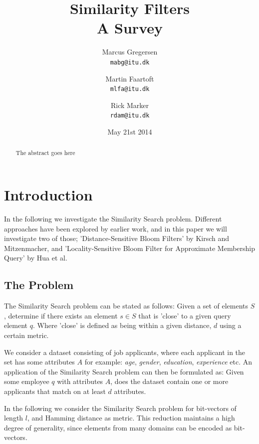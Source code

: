 \documentclass[a4paper,11pt]{article}
\begin{document}
\graphicspath{ {./images/} }
\date{May 21st 2014}
\title{Similarity Filters\\A Survey}

\author{Marcus Gregersen\\
\texttt{mabg@itu.dk}
\and Martin Faartoft\\
\texttt{mlfa@itu.dk}
\and Rick Marker\\
\texttt{rdam@itu.dk}}
\clearpage\maketitle
\thispagestyle{empty}
\setcounter{page}{1}
\begin{abstract}
The abstract goes here
\end{abstract}

\newpage

\section{Introduction}
In the following we investigate the Similarity Search problem. Different approaches have been explored by earlier work, and in this paper we will investigate two of those; 'Distance-Sensitive Bloom Filters'\cite{paper:harvard} by Kirsch and Mitzenmacher, and 'Locality-Sensitive Bloom Filter for Approximate Membership Query'\cite{paper:hua} by Hua et al.

\subsection{The Problem}
The Similarity Search problem can be stated as follows: Given a set of elements $S$, determine if there exists an element $s \in S$ that is 'close' to a given query element $q$. Where 'close' is defined as being within a given distance, $d$ using a certain metric.

We consider a dataset consisting of job applicants, where each applicant in the set has some attributes $A$ for example: \textit{age}, \textit{gender}, \textit{education}, \textit{experience} etc.
An application of the Similarity Search problem can then be formulated as: Given some employee $q$ with attributes $A$, does the dataset contain one or more applicants that match on at least $d$ attributes.

In the following we consider the Similarity Search problem for bit-vectors of length $l$, and Hamming distance as metric. This reduction maintains a high degree of generality, since elements from many domains can be encoded as bit-vectors.
\end{document}
